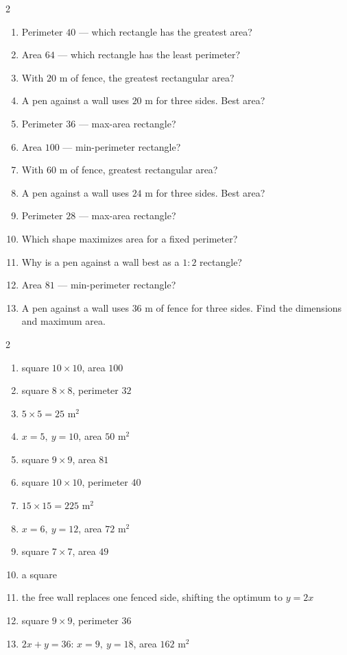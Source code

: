 \documentclass[11pt]{article}
\begin{document}
\begin{recapbox}
\begin{multicols}{2}
\small
\begin{enumerate}[leftmargin=*,itemsep=3pt]
  \item Perimeter $40$ — which rectangle has the greatest area?
  \item Area $64$ — which rectangle has the least perimeter?
  \item With $20$ m of fence, the greatest rectangular area?
  \item A pen against a wall uses $20$ m for three sides. Best area?
  \item Perimeter $36$ — max-area rectangle?
  \item Area $100$ — min-perimeter rectangle?
  \item With $60$ m of fence, greatest rectangular area?
  \item A pen against a wall uses $24$ m for three sides. Best area?
  \item Perimeter $28$ — max-area rectangle?
  \item Which shape maximizes area for a fixed perimeter?
  \item Why is a pen against a wall best as a $1{:}2$ rectangle?
  \item Area $81$ — min-perimeter rectangle?
  \item A pen against a wall uses $36$ m of fence for three sides. Find the dimensions and maximum area.
\end{enumerate}
\end{multicols}
\end{recapbox}

\begin{keybox}
\begin{multicols}{2}
\small
\begin{enumerate}[leftmargin=*,itemsep=3pt]
  \item square $10\times10$, area $100$
  \item square $8\times8$, perimeter $32$
  \item $5\times5=25$ m$^2$
  \item $x=5,\ y=10$, area $50$ m$^2$
  \item square $9\times9$, area $81$
  \item square $10\times10$, perimeter $40$
  \item $15\times15=225$ m$^2$
  \item $x=6,\ y=12$, area $72$ m$^2$
  \item square $7\times7$, area $49$
  \item a square
  \item the free wall replaces one fenced side, shifting the optimum to $y=2x$
  \item square $9\times9$, perimeter $36$
  \item $2x+y=36$: $x=9,\ y=18$, area $162$ m$^2$
\end{enumerate}
\end{multicols}
\end{keybox}
\end{document}
